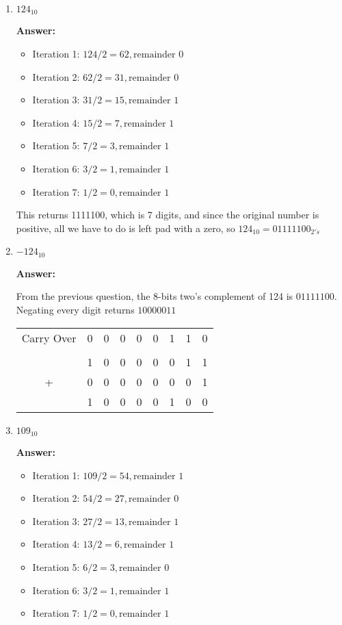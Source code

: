 \documentclass[12pt]{extreport}
\newcommand{\answer}[0]{\medskip \textbf{Answer:} \medskip}
\begin{document}
\begin{enumerate}

    \item \( 124_{10} \)
    
        \answer
        \begin{itemize}
            \item Iteration 1: \( 124 / 2 = 62, \text{remainder } 0 \)
            \item Iteration 2: \( 62 / 2 = 31, \text{remainder } 0 \)
            \item Iteration 3: \( 31 / 2 = 15, \text{remainder } 1 \)
            \item Iteration 4: \( 15 / 2 = 7, \text{remainder } 1 \)
            \item Iteration 5: \( 7 / 2 = 3, \text{remainder } 1 \)
            \item Iteration 6: \( 3 / 2 = 1, \text{remainder } 1 \)
            \item Iteration 7: \( 1 / 2 = 0, \text{remainder } 1 \)
        \end{itemize}

        This returns 1111100, which is 7 digits, and since the original number is positive, all we have to do is left pad with a zero, so \( 124_{10} = 01111100_{2's} \)

    \item \( -124_{10} \)
    
        \answer

        From the previous question, the 8-bits two's complement of 124 is \( 01111100 \). Negating every digit returns \( 10000011 \)

        \begin{tabular}{ccccccccc}
            Carry Over &0& 0& 0& 0& 0& 1& 1& 0 \\
            \\
            & 1& 0& 0& 0& 0& 0& 1& 1 \\
            + & 0& 0& 0& 0& 0& 0& 0& 1 \\
            \hline
            & 1& 0& 0& 0& 0& 1& 0& 0
        \end{tabular}

    \item \( 109_{10} \)
    
        \answer
        \begin{itemize}
            \item Iteration 1: \( 109 / 2 = 54, \text{remainder } 1 \)
            \item Iteration 2: \( 54 / 2 = 27, \text{remainder } 0 \)
            \item Iteration 3: \( 27 / 2 = 13, \text{remainder } 1 \)
            \item Iteration 4: \( 13 / 2 = 6, \text{remainder } 1 \)
            \item Iteration 5: \( 6 / 2 = 3, \text{remainder } 0 \)
            \item Iteration 6: \( 3 / 2 = 1, \text{remainder } 1 \)
            \item Iteration 7: \( 1 / 2 = 0, \text{remainder } 1 \)
        \end{itemize}


\end{enumerate}
\end{document}
